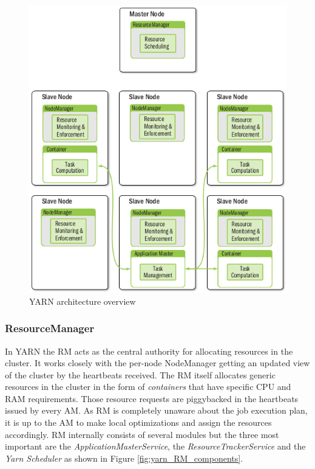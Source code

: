 \begin{figure}
\centering
\includegraphics[scale=0.5]{resources/images/Background/yarn_arch_overview.png}
\caption{YARN architecture overview \cite{Murthy:2014:AHY:2636998}}
\label{fig:yarn_arch_overview}
\end{figure}

\subsubsection{ResourceManager}
\label{sssec:rm}
In YARN the RM acts as the central authority for allocating resources
in the cluster. It works closely with the per-node NodeManager getting
an updated view of the cluster by the heartbeats received. The RM
itself allocates generic resources in the cluster in the form of
\emph{containers} that have specific CPU and RAM requirements. Those
resource requests are piggybacked in the heartbeats issued by every AM.
As RM is completely unaware about the job execution plan,
it is up to the AM to make local optimizations and assign the
resources accordingly. RM internally consists of several modules but
the three most important are the \emph{ApplicationMasterService}, the
\emph{ResourceTrackerService} and the \emph{Yarn Scheduler} as shown
in Figure \ref{fig:yarn_RM_components}.

